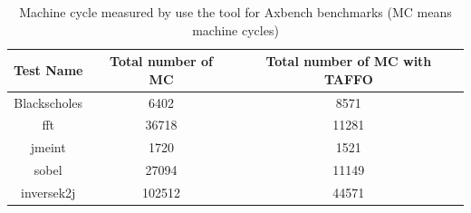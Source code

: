 \begin{table}[ht]
\begin{center}
\caption{Machine cycle measured by use the tool for Axbench benchmarks (MC means machine cycles)}
\vspace{0.5cm}
\begin{tabular}{ |c|c|c| } 
 \hline
Test Name & Total number of MC & Total number of MC with TAFFO \\
 \hline
  Blackscholes & 6402 & 8571 \\
 \hline
  fft & 36718 & 11281 \\
 \hline
  jmeint & 1720 & 1521 \\
 \hline
  sobel & 27094 & 11149 \\
 \hline
  inversek2j & 102512 & 44571 \\
 \hline
 \end{tabular}
\end{center}
\end{table}

